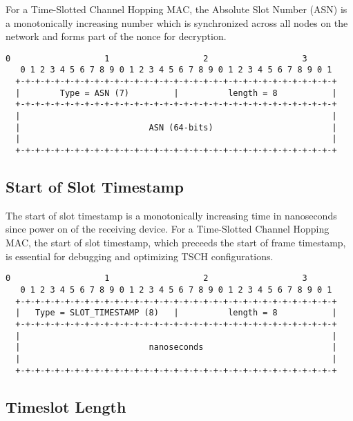 \documentclass[12pt]{article}
\renewcommand\_{\textunderscore\allowbreak}
\begin{document}
For a Time-Slotted Channel Hopping MAC, the Absolute Slot Number (ASN)
is a monotonically increasing number which is synchronized across all nodes on
the network and forms part of the nonce for decryption.

\begin{Verbatim}[samepage=true]
   0                   1                   2                   3
   0 1 2 3 4 5 6 7 8 9 0 1 2 3 4 5 6 7 8 9 0 1 2 3 4 5 6 7 8 9 0 1
  +-+-+-+-+-+-+-+-+-+-+-+-+-+-+-+-+-+-+-+-+-+-+-+-+-+-+-+-+-+-+-+-+
  |        Type = ASN (7)         |          length = 8           |
  +-+-+-+-+-+-+-+-+-+-+-+-+-+-+-+-+-+-+-+-+-+-+-+-+-+-+-+-+-+-+-+-+
  |                                                               |
  |                          ASN (64-bits)                        |
  |                                                               |
  +-+-+-+-+-+-+-+-+-+-+-+-+-+-+-+-+-+-+-+-+-+-+-+-+-+-+-+-+-+-+-+-+
\end{Verbatim}

\subsection{Start of Slot Timestamp}

The start of slot timestamp is a monotonically increasing time in nanoseconds
since power on of the receiving device.  For a Time-Slotted Channel Hopping
MAC, the start of slot timestamp, which preceeds the start of frame timestamp,
is essential for debugging and optimizing TSCH configurations.

\begin{Verbatim}[samepage=true]
   0                   1                   2                   3
   0 1 2 3 4 5 6 7 8 9 0 1 2 3 4 5 6 7 8 9 0 1 2 3 4 5 6 7 8 9 0 1
  +-+-+-+-+-+-+-+-+-+-+-+-+-+-+-+-+-+-+-+-+-+-+-+-+-+-+-+-+-+-+-+-+
  |   Type = SLOT_TIMESTAMP (8)   |          length = 8           |
  +-+-+-+-+-+-+-+-+-+-+-+-+-+-+-+-+-+-+-+-+-+-+-+-+-+-+-+-+-+-+-+-+
  |                                                               |
  |                          nanoseconds                          |
  |                                                               |
  +-+-+-+-+-+-+-+-+-+-+-+-+-+-+-+-+-+-+-+-+-+-+-+-+-+-+-+-+-+-+-+-+
\end{Verbatim}

\subsection{Timeslot Length}
\end{document}
